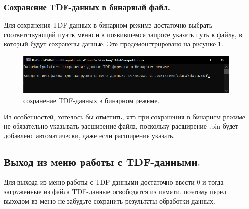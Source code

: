 \subsubsection{ \standartTitleFont
  Сохранение TDF-данных в бинарный файл.
} \label{subsubsec:TDFSafeBIN}

{\standartFont

  \par Для сохранения TDF-данных в бинарном режиме достаточно выбрать соответствующий пунтк меню и в появившемся запросе указать путь к файлу, в который будут сохранены данные. Это продемонстрировано на рисунке \ref{fig:TDFsafeBIN}.

  \begin{figure}[H]
    \centering
    \includegraphics[width=\textwidth]{images/forDataManipulator/TDFsafeBIN.png}
    \caption{сохранение TDF-данных в бинарном режиме.} 
    \label{fig:TDFsafeBIN}
  \end{figure}

  \par Из особенностей, хотелось бы отметить, что при сохранении в бинарном режиме не обязательно указывать расширение файла, поскольку расширение .bin будет добавлено автоматически, даже если расширение указать. 
}

\subsection{ \standartTitleFont
  Выход из меню работы с TDF-данными.
} \label{subsubsec:TDFOut}

{\standartFont

  \par Для выхода из меню работы с TDF-данными достаточно ввести 0 и тогда загруженные из файла TDF-данные освободятся из памяти, поэтому перед выходом из меню не забудьте сохранить результаты обработки данных. 

  \par
}